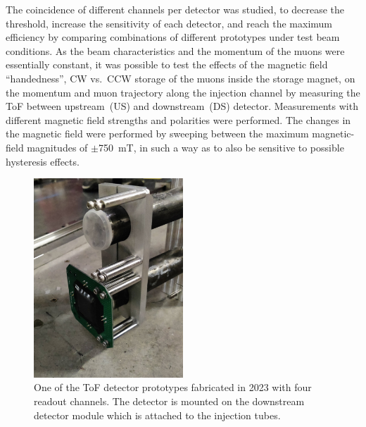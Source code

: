 \begin{refsection}
        \noindent
        The coincidence of different channels per detector was studied, to decrease the threshold, increase the sensitivity of each detector, and reach the maximum efficiency by comparing combinations of different prototypes under test beam conditions. 
        As the beam characteristics and the momentum of the muons were essentially constant, it was possible to test the effects of the magnetic field ``handedness'', CW vs.\ CCW storage of the muons inside the storage magnet, on the momentum and muon trajectory along the injection channel by measuring the ToF between upstream~(US) and downstream~(DS) detector. 
        Measurements with different magnetic field strengths and polarities were performed.
        The changes in the magnetic field were performed by sweeping between the maximum magnetic-field magnitudes of $\pm$\SI{750}{\milli\tesla}, in such a way as to also be sensitive to possible hysteresis effects.
        \begin{figure}
            \centering
            \includegraphics[width=0.5\textwidth]{Figures/muEDM_Dec2023/IMG_20231209_225342Small.png}
            \caption{One of the ToF detector prototypes fabricated in 2023 with four readout channels. The detector is mounted on the downstream detector module which is attached to the injection tubes.}
            \label{fig:TB2023ToFPhoto}
        \end{figure}
        

\end{refsection}
